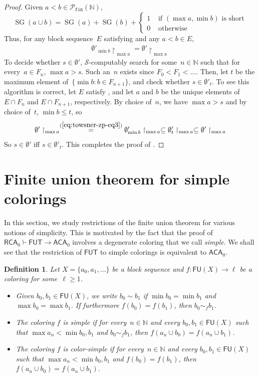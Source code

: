 \documentclass[10pt,a4paper]{article}
\def\Sc{\mathcal{S}}
\newcommand{\uh}{\upharpoonright}
\newcommand{\RCA}[0]{\mathsf{RCA}}
\newcommand{\ACA}[0]{\mathsf{ACA}}
\newcommand{\FUT}[0]{\mathsf{FUT}}
\newcommand{\NN}[0]{\mathbb{N}}
\newcommand{\SG}{\operatorname{SG}} %
\newcommand{\Pfin}{\mathcal{P}_{\mathtt{fin}}}
\newcommand{\FU}[0]{\mathsf{FU}} %
\numberwithin{theorem}{section}
\newtheorem{definition}[theorem]{Definition}
\begin{document}
\begin{proof}
\noindent
Given $a < b \in \Pfin(\NN)$, 
$$
\SG(a \cup b) = \SG(a) + \SG(b) + \begin{cases}
    1 & \text{ if $(\max a, \min b)$ is short}\\
    0 & \text{ otherwise}
\end{cases}
$$
Thus, for any block sequence~$E$ satisfying  and any $a < b \in E$,
\begin{align}\label{eq:towsner-zp-eq3}
\emptyset'_{\min b} \uh_{\max a} = \emptyset' \uh_{\max a}
\end{align}
To decide whether $s \in \emptyset'$, $\Sc$-computably search for some~$n \in \NN$ such that for every~$a \in F_n$, $\max a > s$. Such an~$n$ exists since $F_0 < F_1 < \dots$.
Then, let $t$ be the maximum element of~$\{ \min b : b \in F_{n+1} \}$, and check whether $s \in \emptyset'_t$.
To see this algorithm is correct, let $E$ satisfy , and let $a$ and $b$ be the unique elements of $E \cap F_n$ and $E \cap F_{n+1}$, respectively. By choice of~$n$, we have $\max a > s$ and by choice of~$t$, $\min b \leq t$, so
$$
\emptyset' \uh_{\max a} \overset{(\ref{eq:towsner-zp-eq3})}=  \emptyset'_{\min b} \uh_{\max a}  \subseteq  \emptyset'_t \uh_{\max a} \subseteq  \emptyset' \uh_{\max a}
$$
So $s \in \emptyset'$ iff $s \in \emptyset'_t$. This completes the proof of .
\end{proof}

\section{Finite union theorem for simple colorings}

In this section, we study restrictions of the finite union theorem for various notions of simplicity.
This is motivated by the fact that the proof of $\RCA_0 \vdash \FUT \to \ACA_0$ involves a degenerate coloring that we call \emph{simple}. We shall see that the restriction of $\FUT$ to simple colorings is equivalent to $\ACA_0$.

\begin{definition}
Let $X = \{ a_0, a_1, \dots \}$ be a block sequence and $f : \FU(X) \to \ell$ be a coloring for some~$\ell \geq 1$.
\begin{itemize}
    \item Given $b_0, b_1 \in \FU(X)$, we write $b_0 \sim b_1$ if $\min b_0 = \min b_1$ and $\max b_0 = \max b_1$. If furthermore $f(b_0) = f(b_1)$, then $b_0 \sim_f b_1$.
    \item The coloring $f$ is \emph{simple} if for every~$n \in \NN$ and every $b_0, b_1 \in \FU(X)$ such that $\max a_n < \min b_0, b_1$ and $b_0 \sim_f b_1$, then $f(a_n \cup b_0) = f(a_n \cup b_1)$.
    \item The coloring $f$ is \emph{color-simple} if for every~$n \in \NN$ and every $b_0, b_1 \in \FU(X)$ such that $\max a_n < \min b_0, b_1$ and $f(b_0) = f(b_1)$, then $f(a_n \cup b_0) = f(a_n \cup b_1)$.
\end{itemize}
\end{definition}
\end{document}
